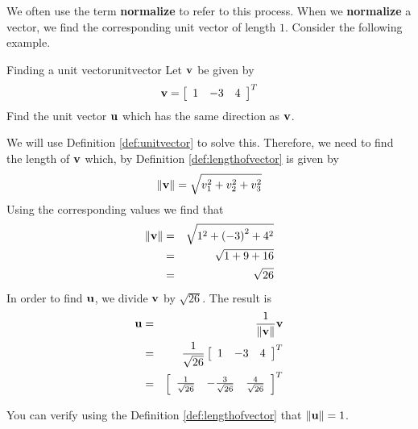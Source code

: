 We often use the term \textbf{normalize} to refer to this process. When we \textbf{normalize} a vector, we find the corresponding unit vector of length $1$. 
Consider the following example.

\begin{example}{Finding a unit vector}{unitvector}
Let ${\bf v}$ be given by 
\begin{equation*}
{\bf v}
=
\left[
\begin{array}{rrr}
1 & -3 & 4
\end{array}
\right]^T
\end{equation*}
Find the unit vector ${\bf u}$ which has the same direction as ${\bf v}$.
\end{example}

\begin{solution}
We will use Definition \ref{def:unitvector} to solve this. 
Therefore, we need to find the length of ${\bf v}$ which, by Definition \ref{def:lengthofvector}
is given by 
\begin{equation*}
\|
{\bf v}
\|
= \sqrt{ v_{1}^2 + v_{2}^2+ v_{3}^2}
\end{equation*}
Using the corresponding  values we find that
\begin{eqnarray*}
\|
{\bf v}
\|
&=& \sqrt{ 1^2 + \left(-3 \right)^2 + 4^2} \\
&=& \sqrt{ 1 + 9 + 16} \\
&=& \sqrt{26} 
\end{eqnarray*}
In order to find ${\bf u}$, we divide ${\bf v}$ by $\sqrt{26}$.
The result is 
\begin{eqnarray*}
{\bf u}
&=&
\frac{1}{\| {\bf v} \|}
{\bf v} \\
&=&
\frac{1}{\sqrt{26}}
\left[
\begin{array}{rrr}
1 & -3 & 4
\end{array}
\right]^T \\
&=&
\left[
\begin{array}{rrr}
\frac{1}{\sqrt{26}} & -\frac{3}{\sqrt{26}} & \frac{4}{\sqrt{26}}
\end{array}
\right]^T
\end{eqnarray*}

You can verify using the Definition \ref{def:lengthofvector} that $\| {\bf u} \| = 1 $. 
\end{solution}
